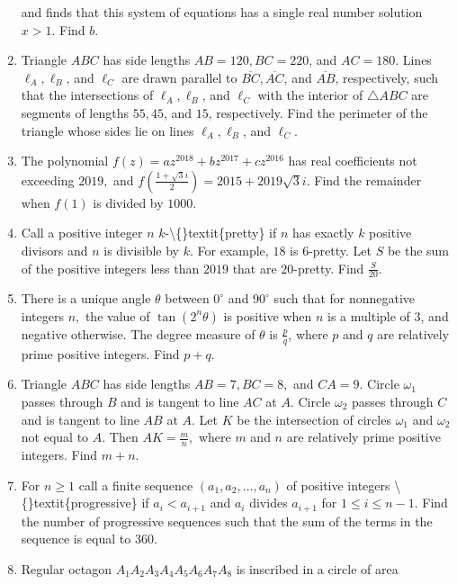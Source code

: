 \documentclass{article}
\begin{document}
\begin{enumerate}[label=\arabic*., itemsep=0.5em]
and finds that this system of equations has a single real number solution \(x>1\). Find \(b\).\par \vspace{0.5em}\item Triangle \(ABC\) has side lengths \(AB=120,BC=220\), and \(AC=180\). Lines \(\ell_A,\ell_B\), and \(\ell_C\) are drawn parallel to \(\overline{BC},\overline{AC}\), and \(\overline{AB}\), respectively, such that the intersections of \(\ell_A,\ell_B\), and \(\ell_C\) with the interior of \(\triangle ABC\) are segments of lengths \(55,45\), and \(15\), respectively. Find the perimeter of the triangle whose sides lie on lines \(\ell_A,\ell_B\), and \(\ell_C\).\par \vspace{0.5em}\item The polynomial \(f(z)=az^{2018}+bz^{2017}+cz^{2016}\) has real coefficients not exceeding \(2019,\) and \(f\left(\tfrac{1+\sqrt3i}{2}\right)=2015+2019\sqrt3i\). Find the remainder when \(f(1)\) is divided by \(1000\).\par \vspace{0.5em}\item Call a positive integer \(n\) \(k\)-\textbackslash\{\}textit\{pretty\} if \(n\) has exactly \(k\) positive divisors and \(n\) is divisible by \(k\). For example, \(18\) is \(6\)-pretty. Let \(S\) be the sum of the positive integers less than \(2019\) that are \(20\)-pretty. Find \(\tfrac{S}{20}\).\par \vspace{0.5em}\item There is a unique angle \(\theta\) between \(0^\circ\) and \(90^\circ\) such that for nonnegative integers \(n,\) the value of \(\tan(2^n\theta)\) is positive when \(n\) is a multiple of \(3\), and negative otherwise. The degree measure of \(\theta\) is \(\tfrac{p}{q}\), where \(p\) and \(q\) are relatively prime positive integers. Find \(p+q\).\par \vspace{0.5em}\item Triangle \(ABC\) has side lengths \(AB=7,BC=8,\) and \(CA=9.\) Circle \(\omega_1\) passes through \(B\) and is tangent to line \(AC\) at \(A.\) Circle \(\omega_2\) passes through \(C\) and is tangent to line \(AB\) at \(A.\) Let \(K\) be the intersection of circles \(\omega_1\) and \(\omega_2\) not equal to \(A.\) Then \(AK=\tfrac{m}{n},\) where \(m\) and \(n\) are relatively prime positive integers. Find \(m+n.\)\par \vspace{0.5em}\item For \(n\ge1\) call a finite sequence \((a_1,a_2,\ldots,a_n)\) of positive integers \textbackslash\{\}textit\{progressive\} if \(a_i<a_{i+1}\) and \(a_i\) divides \(a_{i+1}\) for \(1\le i\le n-1\). Find the number of progressive sequences such that the sum of the terms in the sequence is equal to \(360.\)\par \vspace{0.5em}\item Regular octagon \(A_1A_2A_3A_4A_5A_6A_7A_8\) is inscribed in a circle of area 
\end{enumerate}
\end{document}
